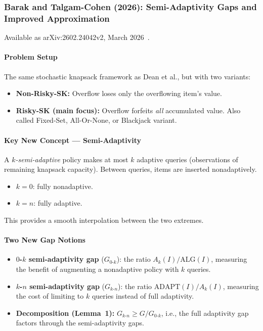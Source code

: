 \subsubsection{Barak and Talgam-Cohen (2026): Semi-Adaptivity Gaps and Improved Approximation}

Available as arXiv:2602.24042v2, March 2026~\cite{BarakTalgamCohen2026}.

\paragraph{Problem Setup}

The same stochastic knapsack framework as Dean et al., but with two variants:
\begin{itemize}
    \item \textbf{Non-Risky-SK:} Overflow loses only the overflowing item's value.
    \item \textbf{Risky-SK (main focus):} Overflow forfeits \emph{all} accumulated value. Also called Fixed-Set, All-Or-None, or Blackjack variant.
\end{itemize}

\paragraph{Key New Concept --- Semi-Adaptivity}

A \emph{$k$-semi-adaptive} policy makes at most $k$ adaptive queries (observations of remaining knapsack capacity). Between queries, items are inserted nonadaptively.
\begin{itemize}
    \item $k = 0$: fully nonadaptive.
    \item $k = n$: fully adaptive.
\end{itemize}
This provides a smooth interpolation between the two extremes.

\paragraph{Two New Gap Notions}

\begin{itemize}
    \item \textbf{$0$-$k$ semi-adaptivity gap} ($G_{0\text{-}k}$): the ratio $A_k(I) / \mathrm{ALG}(I)$, measuring the benefit of augmenting a nonadaptive policy with $k$ queries.
    \item \textbf{$k$-$n$ semi-adaptivity gap} ($G_{k\text{-}n}$): the ratio $\mathrm{ADAPT}(I) / A_k(I)$, measuring the cost of limiting to $k$ queries instead of full adaptivity.
    \item \textbf{Decomposition (Lemma~1):} $G_{k\text{-}n} \ge G / G_{0\text{-}k}$, i.e., the full adaptivity gap factors through the semi-adaptivity gaps.
\end{itemize}


